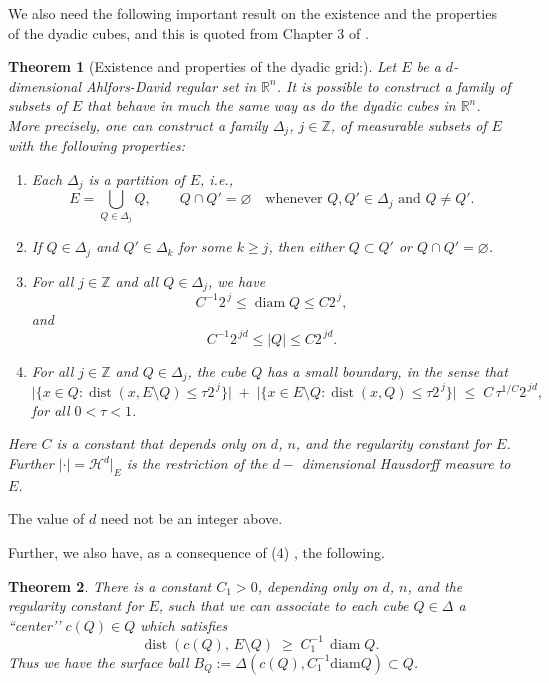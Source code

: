 \documentclass{article}
\newcounter{lem}
\theoremstyle{plain}
\theoremstyle{plain}
\newtheorem{theorem}{Theorem}[section]
\theoremstyle{definition}
\theoremstyle{plain}
\begin{document}
We also need the following important result on the existence and the properties of the dyadic cubes, and this is quoted from Chapter 3 of \cite{DS2}.

\begin{theorem}[Existence and properties of the dyadic grid:]\label{cubelemma}
 Let $E$ be a $d$-dimensional Ahlfors-David regular set in $\mathbb{R}^{n}$.  
It is possible to construct a family of subsets of $E$ that behave in much the same way as do the dyadic cubes in $\mathbb{R}^n$.  
More precisely, one can construct a family $\Delta_j$, $j \in \mathbb{Z}$, of measurable subsets of $E$ with the following properties:

\begin{enumerate}
\item[(1)] Each $\Delta_j$ is a partition of $E$, i.e.,
\[
E = \bigcup_{Q \in \Delta_j} Q, \qquad
Q \cap Q' = \varnothing \quad \text{whenever } Q, Q' \in \Delta_j \text{ and } Q \neq Q'.
\]

\item[(2)] If $Q \in \Delta_j$ and $Q' \in \Delta_k$ for some $k \ge j$, then either $Q \subset Q'$ or $Q \cap Q' = \varnothing$.

\item[(3)] For all $j \in \mathbb{Z}$ and all $Q \in \Delta_j$, we have
\[
C^{-1} 2^{\,j} \le \operatorname{diam} Q \le C 2^{\,j},
\]
and
\[
C^{-1} 2^{\,jd} \le |Q| \le C 2^{\,jd}.
\]

\item[(4)] For all $j \in \mathbb{Z}$ and $Q \in \Delta_j$, the cube $Q$ has a small boundary, in the sense that
\[
\bigl|\{x \in Q : \operatorname{dist}(x, E \setminus Q) \le \tau 2^{\,j}\}\bigr|
\;+\;
\bigl|\{x \in E \setminus Q : \operatorname{dist}(x, Q) \le \tau 2^{\,j}\}\bigr|
\;\le\;
C \, \tau^{1/C} 2^{\,jd},
\]
for all $0 < \tau < 1$.
\end{enumerate}

Here $C$ is a constant that depends only on $d$, $n$, and the regularity constant for $E$.  Further $|\cdot|=\mathcal{H}^d|_{E}$ is the restriction of the $d-$ dimensional Hausdorff measure to $E$.
\end{theorem}

The value of $d$ need not be an integer above.

 Further, we also have, as a consequence of (4) , the following. 

\begin{theorem}\label{center}
There is a constant $C_1 > 0$, depending only on $d$, $n$, and the regularity constant for $E$, such that we can associate to each cube $Q \in \Delta$ a “center’’ $c(Q) \in Q$ which satisfies
\begin{equation}
\label{eq:36}
\operatorname{dist}(c(Q),\, E \setminus Q) \;\ge\; C_1^{-1} \, \operatorname{diam} Q.
\end{equation}
Thus we have the surface ball $B_Q :=\Delta(c(Q), C_{1}^{-1}\text{diam} Q)\subset Q$.

\end{theorem}
\end{document}
